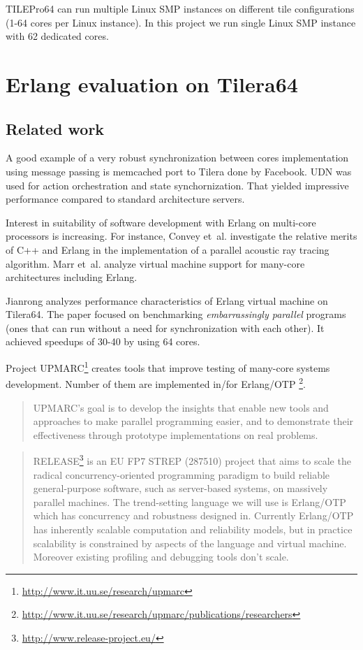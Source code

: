 \documentclass[english,11pt]{l4proj}
\begin{document}
TILEPro64 can run multiple Linux SMP instances on different tile configurations
(1-64 cores per Linux instance). In this project we run single Linux SMP
instance with 62 dedicated cores.

\section{Erlang evaluation on Tilera64}
\label{sec:erlang-eval}

\subsection{Related work}

A good example of a very robust synchronization between cores implementation
using message passing is memcached port to Tilera done by Facebook. UDN was used
for action orchestration and state synchornization\cite{facebook-tilera}. That
yielded impressive performance compared to standard architecture servers.

Interest in suitability of software development with Erlang on multi-core
processors is increasing. For instance, Convey et~al.\cite{erlang-acoustic}
investigate the relative merits of C++ and Erlang in the implementation of a
parallel acoustic ray tracing algorithm. Marr et~al.\cite{vm-manycore} analyze
virtual machine support for many-core architectures including Erlang.

Jianrong \cite{erlang-manycore-scalability} analyzes performance characteristics
of Erlang virtual machine on Tilera64. The paper focused on benchmarking
\emph{embarrassingly parallel} programs (ones that can run without a need for
synchronization with each other). It achieved speedups of 30-40 by using 64
cores.

Project UPMARC\footnote{\url{http://www.it.uu.se/research/upmarc}} creates tools
that improve testing of many-core systems development. Number of them are
implemented in/for
Erlang/OTP
\footnote{\url{http://www.it.uu.se/research/upmarc/publications/researchers}}.

\begin{quote}
UPMARC's goal is to develop the insights that enable new tools and approaches to
make parallel programming easier, and to demonstrate their effectiveness through
prototype implementations on real problems.
\end{quote}

\begin{quote}
RELEASE\footnote{\url{http://www.release-project.eu/}} is an EU FP7 STREP
(287510) project that aims to scale the radical concurrency-oriented programming
paradigm to build reliable general-purpose software, such as server-based
systems, on massively parallel machines. The trend-setting language we will use
is Erlang/OTP which has concurrency and robustness designed in. Currently
Erlang/OTP has inherently scalable computation and reliability models, but in
practice scalability is constrained by aspects of the language and virtual
machine. Moreover existing profiling and debugging tools don't scale.
\end{quote}
\end{document}
